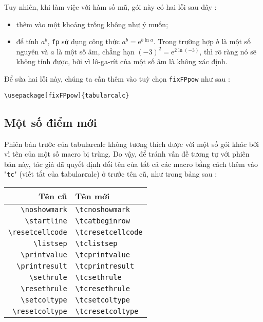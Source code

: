 \documentclass[a4paper,10pt]{article}
\newcommand\tbcalc{\textsf{tabularcalc}\xspace}
\newcommand\mywidth{0.85\linewidth}
\begin{document}
Tuy nhiên, khi làm việc với hàm số mũ, gói này có hai lỗi sau đây :
\begin{itemize}
	\item thêm vào một khoảng trống không như ý muốn;
	\item để tính $a^b$, \verb=fp= sử dụng công thức $a^b=\mathrm{e}^{b\ln a}$. Trong trường hợp $b$ là một số nguyên và $a$ là một số âm, chẳng hạn $(-3)^2=\mathrm{e}^{2\ln(-3)}$, thì rõ ràng nó sẽ không tính được, bởi vì lô-ga-rít của một số âm là không xác định.
\end{itemize}\smallskip
Để sửa hai lỗi này, chúng ta cần thêm vào tuỳ chọn \verb=fixFPpow= như sau :
\begin{center}
\begin{minipage}{\mywidth}
\begin{lstlisting}
\usepackage[fixFPpow]{tabularcalc}
\end{lstlisting}
\end{minipage}
\end{center}

\subsection{Một số điểm mới}
Phiên bản trước của \tbcalc không tương thích được với một số gói khác bởi vì tên của một số macro bị trùng. Do vậy, để tránh vấn đề tương tự với phiên bản này, tác giả đã quyết định đổi tên của tất cả các macro bằng cách thêm vào "\verb-tc-" (viết tắt của \textsf{\textbf{t}abular\textbf{c}alc}) ở trước tên cũ, như trong bảng sau :
\begin{center}
	\begin{tabular}{rl}
		Tên cũ&Tên mới \\\hline
		\verb=\noshowmark=&\verb=\tcnoshowmark=\\
		\verb=\startline=&\verb=\tcatbeginrow=\\
		\verb=\resetcellcode=&\verb=\tcresetcellcode=\\
		\verb=\listsep=&\verb=\tclistsep=\\
		\verb=\printvalue=&\verb=\tcprintvalue=\\
		\verb=\printresult=&\verb=\tcprintresult=\\
		\verb=\sethrule=&\verb=\tcsethrule=\\
		\verb=\resethrule=&\verb=\tcresethrule=\\
		\verb=\setcoltype=&\verb=\tcsetcoltype=\\
		\verb=\resetcoltype=&\verb=\tcresetcoltype=
	\end{tabular}
\end{center}
\end{document}
